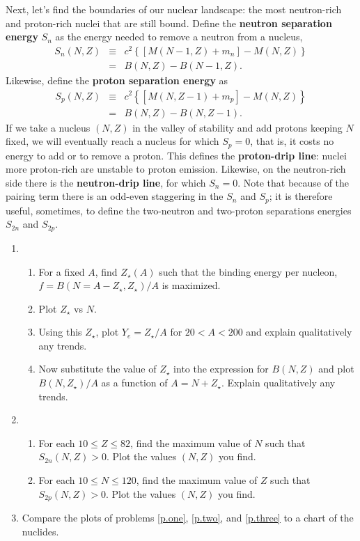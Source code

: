 Next, let's find the boundaries of our nuclear landscape: the most neutron-rich and proton-rich nuclei that are still bound.
Define the \textbf{neutron separation energy} $S_{n}$ as the energy needed to remove a neutron from a nucleus,
\begin{eqnarray}\label{e.Sn}
S_{n}(N,Z) &\equiv& c^{2}\left\{\left[M(N-1,Z) + m_{n}\right] - M(N,Z)\right\} \nonumber\\
	&=& B(N,Z) - B(N-1,Z).
\end{eqnarray}
Likewise, define the \textbf{proton separation energy} as
\begin{eqnarray}\label{e.Sp}
S_{p}(N,Z) &\equiv& c^{2}\left\{\left[M(N,Z-1) + m_{p}\right] - M(N,Z)\right\} \nonumber\\
	&=& B(N,Z) - B(N,Z-1).
\end{eqnarray}
If we take a nucleus $(N,Z)$ in the valley of stability and add protons keeping $N$ fixed, we will eventually reach a nucleus for which $S_{p} = 0$, that is, it costs no energy to add or to remove a proton.  This defines the \textbf{proton-drip line}: nuclei more proton-rich are unstable to proton emission. Likewise, on the neutron-rich side there is the \textbf{neutron-drip line}, for which $S_{n} = 0$. Note that because of the pairing term there is an odd-even staggering in the $S_{n}$ and $S_{p}$; it is therefore useful, sometimes, to define the two-neutron and two-proton separations energies $S_{2n}$ and $S_{2p}$.

\begin{exercisebox}
\begin{enumerate}
\item 
\begin{enumerate}
\item For a fixed $A$, find $Z_\star(A)$ such that the binding energy per nucleon, $f = B(N=A-Z_{\star},Z_{\star})/A$ is maximized.
\item\label{p.one} Plot $Z_{\star}$ vs $N$.
\item Using this $Z_{\star}$, plot $Y_{e}=Z_{\star}/A$ for $20 < A < 200$ and explain qualitatively any trends.
\item Now substitute the value of $Z_{\star}$ into the expression for $B(N,Z)$ and plot $B(N,Z_{\star})/A$ as a function of $A = N + Z_{\star}$. Explain qualitatively any trends.
\end{enumerate}
\item
\begin{enumerate}
\item\label{p.two} For each $10\le Z\le 82$, find the maximum value of $N$ such that $S_{2n}(N,Z) > 0$.  Plot the values $(N,Z)$ you find.  
\item\label{p.three} For each $10\le N\le 120$, find the maximum value of $Z$ such that $S_{2p}(N,Z) > 0$. Plot the values $(N,Z)$ you find. 
\end{enumerate}

\item Compare the plots of problems \ref{p.one}, \ref{p.two}, and \ref{p.three} to a chart of the nuclides.
\end{enumerate}
\end{exercisebox}

